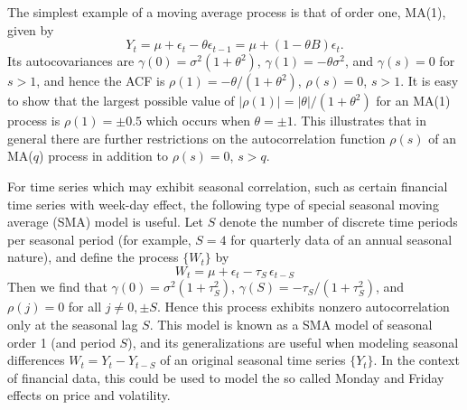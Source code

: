 \begin{ex}\label{ex:movingorder1}
The simplest example of a moving average process is that of order one, MA(1), given by
	\[
	Y_t = \mu + \epsilon_t - \theta \epsilon_{t-1}= \mu + (1 - \theta B) \epsilon_t.
	 \]
Its autocovariances are $\gamma(0)= \sigma^2(1+\theta^2)$, $\gamma(1)= -\theta \sigma^2$, and $\gamma(s)=0$ for $s>1$, and hence the ACF is $\rho(1)= -\theta /(1+\theta^2)$, $\rho(s)=0$, $s>1$. It is easy to show that the largest possible value of $\lvert\rho(1)\rvert= \lvert\theta\rvert / (1+\theta^2)$ for an  MA(1) process is $\rho(1)=\pm 0.5$ which occurs when $\theta = \pm 1$. This illustrates that in general there are further restrictions on the autocorrelation function $\rho(s)$ of an MA($q$)  process in addition to $\rho(s)=0$, $s>q$. 
\end{ex}
    

\begin{ex}\label{ex:seasonal} 
For time series which may exhibit seasonal correlation, such as certain financial time series with week-day effect, the following type of special seasonal moving average (SMA) model is useful. Let $S$ denote the number of discrete time periods per seasonal period (for example, $S=4$ for quarterly data of an annual seasonal nature), and define the process $\{W_t\}$ by
	\[	
	W_t = \mu + \epsilon_t - \tau_S \, \epsilon_{t-S}
	\]
Then we find that $\gamma(0)= \sigma^2(1+\tau_S^2)$, $\gamma(S) = - \tau_S / (1+\tau_S^2)$,  and $\rho(j)=0$ for all $j \neq 0, \pm S$. Hence this process exhibits nonzero autocorrelation only at the seasonal lag $S$. This model is known as a SMA model of seasonal order 1 (and period $S$), and its generalizations are useful when modeling seasonal differences $W_t = Y_t - Y_{t-S}$ of an original seasonal time series $\{Y_t\}$.  In the context of financial data, this could be used to model the so called Monday and Friday effects on price and volatility.
\end{ex}      



